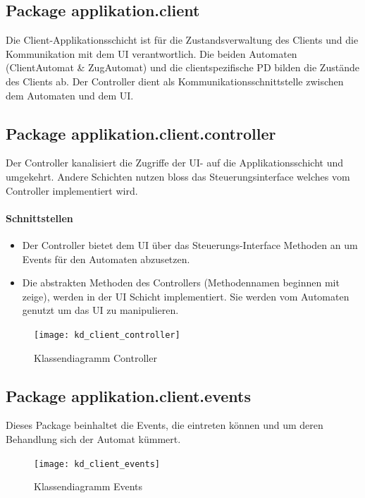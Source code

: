 \documentclass[12pt,halfparskip]{scrartcl}
\begin{document}
\subsection{Package applikation.client}

	Die Client-Applikationsschicht ist für die Zustandsverwaltung des Clients und die Kommunikation mit dem UI verantwortlich. Die beiden Automaten (ClientAutomat \& ZugAutomat) und die clientspezifische PD bilden die Zustände des Clients ab. Der Controller dient als Kommunikationsschnittstelle zwischen dem Automaten und dem UI.
	
	\subsection{Package applikation.client.controller}

		Der Controller kanalisiert die Zugriffe der UI- auf die Applikationsschicht und umgekehrt. Andere Schichten nutzen bloss das Steuerungsinterface welches vom Controller implementiert wird.

		\paragraph{Schnittstellen}
		\begin{itemize}
			\item Der Controller bietet dem UI über das Steuerungs-Interface Methoden an um Events für den Automaten abzusetzen.
			\item Die abstrakten Methoden des Controllers (Methodennamen beginnen mit zeige), werden in der UI Schicht implementiert. Sie werden vom Automaten genutzt um das UI zu manipulieren.
		\end{itemize}

		\begin{figure}[H]
			\centering
			\texttt{[image: kd\_client\_controller]}
			\caption{Klassendiagramm Controller}
			\label{fig:kd_client_controller}
		\end{figure}
		
	\subsection{Package applikation.client.events}

		Dieses Package beinhaltet die Events, die eintreten können und um deren Behandlung sich der Automat kümmert.
		\begin{figure}[H]
			\centering
			\texttt{[image: kd\_client\_events]}
			\caption{Klassendiagramm Events}
			\label{fig:kd_client_events}
		\end{figure}
		
\end{document}
